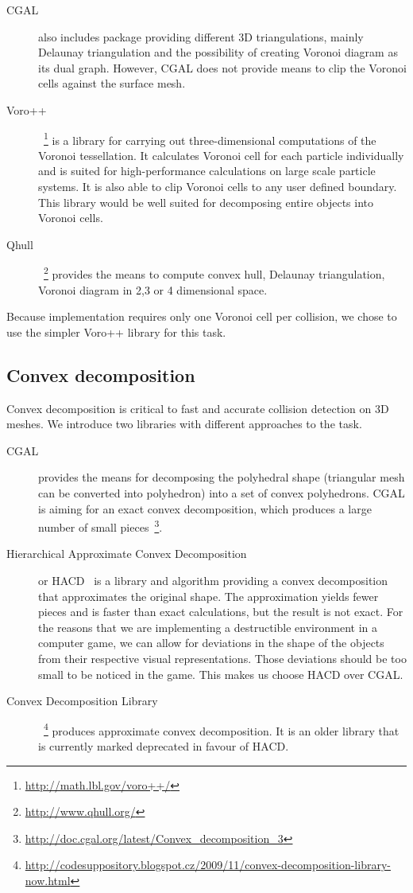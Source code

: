 \begin{description}
\item[CGAL] also includes package providing different 3D triangulations, mainly Delaunay triangulation and the possibility of creating Voronoi diagram as its dual graph. However, CGAL does not provide means to clip the Voronoi cells against the surface mesh.

\item[Voro++]~\footnote{\url{http://math.lbl.gov/voro++/}} is a library for carrying out three-dimensional computations of the Voronoi tessellation. It calculates Voronoi cell for each particle individually and is suited for high-performance calculations on large scale particle systems. It is also able to clip Voronoi cells to any user defined boundary. This library would be well suited for decomposing entire objects into Voronoi cells. 

\item[Qhull]~\footnote{\url{http://www.qhull.org/}} provides the means to compute convex hull, Delaunay triangulation, Voronoi diagram in 2,3 or 4 dimensional space.

\end{description}
Because implementation requires only one Voronoi cell per collision, we chose to use the simpler Voro++ library for this task. 


\subsection{Convex decomposition}
\label{sec:decompositionLib}
Convex decomposition is critical to fast and accurate collision detection on 3D meshes. We introduce two libraries with different approaches to the task.
\begin{description}
\item[CGAL] provides the means for decomposing the polyhedral shape (triangular mesh can be converted into polyhedron) into a set of convex polyhedrons. CGAL is aiming for an exact convex decomposition, which produces a large number of small pieces~\footnote{\url{http://doc.cgal.org/latest/Convex\_decomposition\_3}}.

\item[Hierarchical Approximate Convex Decomposition] or HACD~\cite{HACD} is a library and algorithm providing a convex decomposition that approximates the original shape. The approximation yields fewer pieces and is faster than exact calculations, but the result is not exact. For the reasons that we are implementing a destructible environment in a computer game, we can allow for deviations in the shape of the objects from their respective visual representations. Those deviations should be too small to be noticed in the game. This makes us choose HACD over CGAL.

\item[Convex Decomposition Library]~\footnote{\scriptsize\url{http://codesuppository.blogspot.cz/2009/11/convex-decomposition-library-now.html}} produces approximate convex decomposition. It is an older library that is currently marked deprecated in favour of HACD. 
\end{description}

